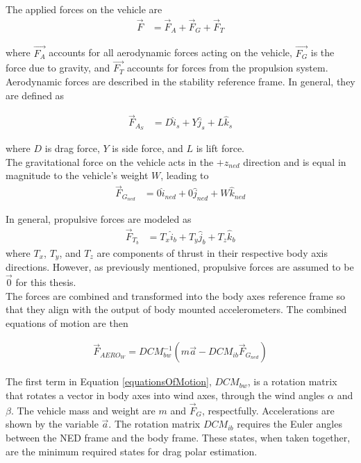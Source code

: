The applied forces on the vehicle are 
\begin{align}
\vec{F} &= \vec{F}_{A}+\vec{F}_{G}+\vec{F}_{T}
\end{align}

where $\vec{F_{A}}$ accounts for all aerodynamic forces acting on the vehicle, $\vec{F_{G}}$ is the force due to gravity, and $\vec{F_{T}}$ accounts for forces from the propulsion system.\\
Aerodynamic forces are described in the stability reference frame. In general, they are defined as

\begin{align}
\vec{F}_{A_S} &= D \hat{i}_s+Y \hat{j}_s+L \hat{k}_s
\end{align}

where $D$ is drag force, $Y$ is side force, and $L$ is lift force.\\
The gravitational force on the vehicle acts in the $+z_{ned}$ direction and is equal in magnitude to the vehicle's weight $W$, leading to
\begin{align}
\vec{F}_{G_{ned}} &= 0\hat{i}_{ned}+0\hat{j}_{ned}+W\hat{k}_{ned}
\end{align}

In general, propulsive forces are modeled as
\begin{align}
\vec{F}_{T_b} &= T_x \hat{i}_b+T_y \hat{j}_b +T_z \hat{k}_b
\end{align}
where $T_x$, $T_y$, and $T_z$ are components of thrust in their respective body axis directions. However, as previously mentioned, propulsive forces are assumed to be $\vec{0}$ for this thesis.\\

The forces are combined and transformed into the body axes reference frame so that they align with the output of body mounted accelerometers. The combined equations of motion are then

\begin{align}
\label{equationsOfMotion}
\vec{F}_{AERO_W} = DCM_{bw}^{-1}(m\vec{a} - DCM_{ib}\vec{F}_{G_{ned}})
\end{align}

The first term in Equation \ref{equationsOfMotion}, $DCM_{bw}$, is a rotation matrix that rotates a vector in body axes into wind axes, through the wind angles $\alpha$ and $\beta$. The vehicle mass and weight are $m$ and $\vec{F}_G$, respectfully. Accelerations are shown by the variable $\vec{a}$. The rotation matrix $DCM_{ib}$ requires the Euler angles between the NED frame and the body frame. These states, when taken together, are the minimum required states for drag polar estimation.

